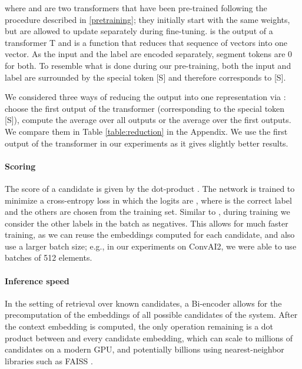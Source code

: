 \documentclass{article} \usepackage{iclr2020_conference,times}
\begin{document}
 where  and  are two transformers that have been pre-trained following the procedure described in \ref{pretraining}; they initially start with the same weights, but are allowed to update separately during fine-tuning.  is the output of a transformer T
 and  is a function that reduces that sequence of vectors  into one vector. As the input and the label are encoded separately, segment tokens are 0 for both.
To resemble what is done during our pre-training, both the input and label are surrounded by the special token [S] and therefore  corresponds to [S].
 
 We considered three ways of reducing the output into one representation via : choose the first output of the transformer (corresponding to the special token [S]),  compute the average over all outputs or the average over the first  outputs. We compare them in Table \ref{table:reduction} in the Appendix. We use the first output of the transformer in our experiments as it gives slightly better results.

\paragraph{Scoring} The score of a candidate  is given by the dot-product . 
The network is trained to minimize a cross-entropy loss in which the logits are , where  is the correct label and the others are chosen from the training set. Similar to  \citet{training_millions}, during training we consider the other labels in
the batch as negatives. This allows for much faster training, as we can reuse the embeddings computed for each candidate, and also use a larger batch size; e.g., in our experiments on ConvAI2, we were able to use batches of 512 elements.



\paragraph{Inference speed} In the setting of retrieval over known candidates, a Bi-encoder allows for the precomputation of the embeddings of all possible candidates of the system. After the context embedding  is computed, the only operation remaining is a dot product between  and every candidate embedding, which can scale to millions of candidates on a modern GPU, and potentially billions using nearest-neighbor libraries such as FAISS \citep{JDH17}.
\end{document}

